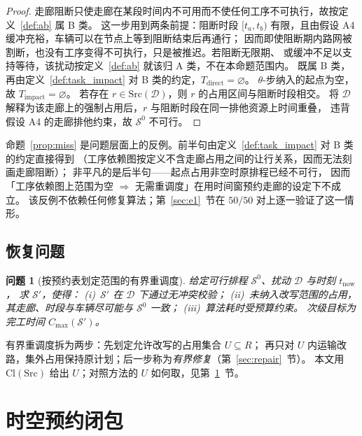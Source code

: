 \documentclass[manuscript,screen,review]{acmart}
\newcommand{\NPairs}{50}
\newcommand{\PassMiss}{\NPairs/\NPairs}      %
\newtheorem{problem}{问题}
\begin{document}
\begin{proof}
走廊阻断只使走廊在某段时间内不可用而不使任何工序不可执行，故按定义~\ref{def:ab} 属 B 类。
这一步用到两条前提：阻断时段 \([t_a,t_b)\) 有限，且由假设 A4 缓冲充裕，车辆可以在节点上等到阻断结束后再通行；
因而即使阻断期内路网被割断，也没有工序变得不可执行，只是被推迟。若阻断无限期、
或缓冲不足以支持等待，该扰动按定义~\ref{def:ab} 就该归 A 类，不在本命题范围内。
既属 B 类，
再由定义~\ref{def:task_impact} 对 B 类的约定，\(T_{\mathrm{direct}}=\varnothing\)。
\(\theta\)-步纳入的起点为空，故 \(T_{\mathrm{impact}}=\varnothing\)。
若存在 \(r\in\mathrm{Src}(\mathcal{D})\)，则 \(r\) 的占用区间与阻断时段相交。
将 \(\mathcal{D}\) 解释为该走廊上的强制占用后，\(r\) 与阻断时段在同一排他资源上时间重叠，
违背假设 A4 的走廊排他约束，故 \(\mathcal{S}^0\) 不可行。
\end{proof}

命题~\ref{prop:miss} 是问题层面上的反例。前半句由定义~\ref{def:task_impact} 对 B 类的约定直接得到
（工序依赖图按定义不含走廊占用之间的让行关系，因而无法刻画走廊阻断）；
非平凡的是后半句——起点占用非空时原排程已经不可行，
因而「工序依赖图上范围为空 \(\Rightarrow\) 无需重调度」在用时间窗预约走廊的设定下不成立。
该反例不依赖任何修复算法；第~\ref{sec:e1}~节在 \(\PassMiss\) 对上逐一验证了这一情形。

\subsection{恢复问题}
\label{sec:recovery_problem}

\begin{problem}[按预约表划定范围的有界重调度]
\label{prob:recovery}
给定可行排程 \(\mathcal{S}^0\)、扰动 \(\mathcal{D}\) 与时刻 \(t_{\mathrm{now}}\)，
求 \(\mathcal{S}'\)，使得：
(i)~\(\mathcal{S}'\) 在 \(\mathcal{D}\) 下通过无冲突校验；
(ii)~未纳入改写范围的占用，其走廊、时段与车辆尽可能与 \(\mathcal{S}^0\) 一致；
(iii)~算法耗时受预算约束。
次级目标为完工时间 \(C_{\max}(\mathcal{S}')\)。
\end{problem}

有界重调度拆为两步：先划定允许改写的占用集合 \(U\subseteq R\)；
再只对 \(U\) 内运输改路，集外占用保持原计划；后一步称为\emph{有界修复}（第~\ref{sec:repair}~节）。
本文用 \(\mathrm{Cl}(\mathrm{Src})\) 给出 \(U\)；对照方法的 \(U\) 如何取，见第~\ref{sec:strc}~节。

\section{时空预约闭包}
\label{sec:strc}
\end{document}
